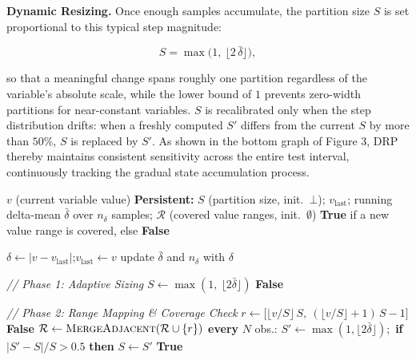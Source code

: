 \documentclass[conference]{IEEEtran}
\begin{document}
\noindent\textbf{Dynamic Resizing.} Once enough samples accumulate, the partition size $S$ is set proportional to this typical step magnitude:

\begin{equation}
\label{eq:drp_sizing}
S = \max\!\big(1,\ \lfloor 2\,\bar{\delta} \rfloor\big),
\end{equation}

\noindent so that a meaningful change spans roughly one partition regardless of the variable's absolute scale, while the lower bound of $1$ prevents zero-width partitions for near-constant variables.
$S$ is recalibrated only when the step distribution drifts: when a freshly computed $S'$ differs from the current $S$ by more than $50\%$, $S$ is replaced by $S'$.
As shown in the bottom graph of Figure 3, DRP thereby maintains consistent sensitivity across the entire test interval, continuously tracking the gradual state accumulation process.

\begin{algorithm}[t]
\caption{Dynamic Range Partitioning (DRP)}
\label{alg:drp}
\begin{algorithmic}[1]
\REQUIRE $v$ (current variable value)
\STATE \textbf{Persistent:} $S$ (partition size, init.\ $\bot$); $v_{\text{last}}$; running delta-mean $\bar{\delta}$ over $n_{\delta}$ samples; $\mathcal{R}$ (covered value ranges, init.\ $\emptyset$)
\ENSURE \textbf{True} if a new value range is covered, else \textbf{False}

\STATE $\delta \leftarrow |v - v_{\text{last}}|$;\quad $v_{\text{last}} \leftarrow v$
    \STATE update $\bar{\delta}$ and $n_{\delta}$ with $\delta$
\ENDIF

\STATE \textit{// Phase 1: Adaptive Sizing}
        \STATE $S \leftarrow \max(1,\ \lfloor 2\bar{\delta} \rfloor)$
    \ELSE
        \RETURN \textbf{False}
    \ENDIF
\ENDIF

\STATE \textit{// Phase 2: Range Mapping \& Coverage Check}
\STATE $r \leftarrow \big[\lfloor v/S \rfloor\, S,\ (\lfloor v/S \rfloor + 1)\, S - 1\big]$
    \RETURN \textbf{False}
\ENDIF
\STATE $\mathcal{R} \leftarrow \textsc{MergeAdjacent}(\mathcal{R} \cup \{r\})$
\STATE \textbf{every} $N$ obs.: $S' \leftarrow \max(1,\lfloor 2\bar{\delta}\rfloor)$;\ \textbf{if} $|S'-S|/S > 0.5$ \textbf{then} $S \leftarrow S'$ 
\RETURN \textbf{True}
\end{algorithmic}
\end{algorithm}
\end{document}
